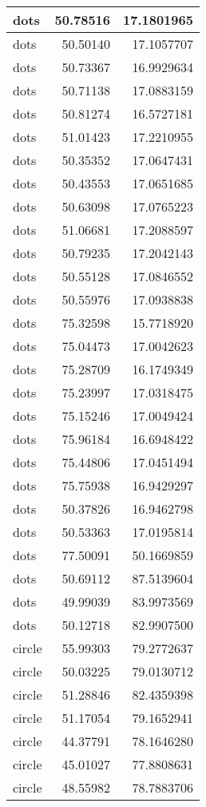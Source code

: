 \documentclass[
]{book}
\theoremstyle{definition}
\theoremstyle{definition}
\theoremstyle{definition}
\theoremstyle{definition}
\theoremstyle{remark}
\begin{document}
\begin{tabular}{l|r|r}
\hline
dots & 50.78516 & 17.1801965\\
\hline
dots & 50.50140 & 17.1057707\\
\hline
dots & 50.73367 & 16.9929634\\
\hline
dots & 50.71138 & 17.0883159\\
\hline
dots & 50.81274 & 16.5727181\\
\hline
dots & 51.01423 & 17.2210955\\
\hline
dots & 50.35352 & 17.0647431\\
\hline
dots & 50.43553 & 17.0651685\\
\hline
dots & 50.63098 & 17.0765223\\
\hline
dots & 51.06681 & 17.2088597\\
\hline
dots & 50.79235 & 17.2042143\\
\hline
dots & 50.55128 & 17.0846552\\
\hline
dots & 50.55976 & 17.0938838\\
\hline
dots & 75.32598 & 15.7718920\\
\hline
dots & 75.04473 & 17.0042623\\
\hline
dots & 75.28709 & 16.1749349\\
\hline
dots & 75.23997 & 17.0318475\\
\hline
dots & 75.15246 & 17.0049424\\
\hline
dots & 75.96184 & 16.6948422\\
\hline
dots & 75.44806 & 17.0451494\\
\hline
dots & 75.75938 & 16.9429297\\
\hline
dots & 50.37826 & 16.9462798\\
\hline
dots & 50.53363 & 17.0195814\\
\hline
dots & 77.50091 & 50.1669859\\
\hline
dots & 50.69112 & 87.5139604\\
\hline
dots & 49.99039 & 83.9973569\\
\hline
dots & 50.12718 & 82.9907500\\
\hline
circle & 55.99303 & 79.2772637\\
\hline
circle & 50.03225 & 79.0130712\\
\hline
circle & 51.28846 & 82.4359398\\
\hline
circle & 51.17054 & 79.1652941\\
\hline
circle & 44.37791 & 78.1646280\\
\hline
circle & 45.01027 & 77.8808631\\
\hline
circle & 48.55982 & 78.7883706\\

\end{tabular}
\end{document}
